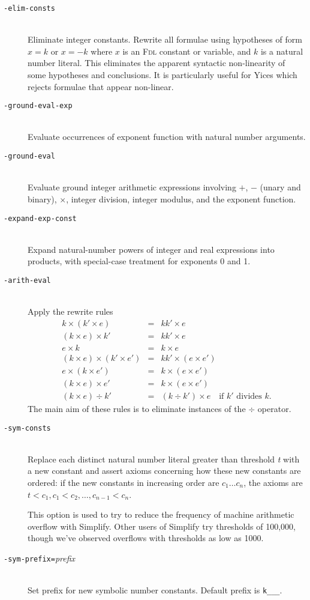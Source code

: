 \documentclass[12pt,fleqn]{article}
\newcommand{\fdl}{\textsc{Fdl}}
\newcommand{\optionb}[1]{\item[\texttt{-{#1}}]\ \\}
\newcommand{\optionv}[2]{\item[\texttt{-{#1}=}\mdseries\textit{#2}]\ \\}
\begin{document}
\begin{description}
\optionb{elim-consts}
  Eliminate integer constants. Rewrite all formulae using hypotheses of
  form $x = k$ or $x = -k$ where $x$ is an \fdl{} constant or variable,
  and $k$ is a natural number literal.  This eliminates the apparent
  syntactic non-linearity of some hypotheses and conclusions.  It is
  particularly useful for Yices which rejects formulae that appear
  non-linear.


\optionb{ground-eval-exp}
  Evaluate occurrences of exponent function with natural number arguments.

\optionb{ground-eval}
  Evaluate ground integer arithmetic expressions involving $+$, $-$
  (unary and binary), $\times$, integer division, integer modulus, and
  the exponent function.

\optionb{expand-exp-const}
  Expand natural-number powers of integer and real expressions into products,
  with special-case treatment for exponents 0 and 1.

\optionb{arith-eval}
  Apply the rewrite rules
  \begin{eqnarray*}
   k \times (k' \times e)   & =  &  kk' \times e \\
   (k \times e) \times k'   & =  &  kk' \times e \\
   e \times k               & =  &  k \times e \\
   (k \times e) \times (k' \times e') &  =  &  kk' \times (e \times e') \\
   e \times (k \times e')   &  = &  k \times (e \times e')  \\
   (k \times e) \times e'   & =  &  k \times (e \times e')  \\
  (k \times e) \div k'      & =  &   (k \div k') \times e  
      \quad\mbox{if $k'$ divides $k$}.
  \end{eqnarray*}
  The main aim of these rules is to eliminate instances of the $\div$
  operator.

\optionb{sym-consts}
  Replace each distinct natural number literal greater than 
  threshold \textit{t} with a new constant and assert axioms concerning
  how these new constants are ordered: if the new constants in increasing
  order are $c_1 \ldots c_n$, the axioms are 
  $t < c_1, c_1 < c_2, \ldots, c_{n-1} < c_n$.

  This option is used to try to reduce the frequency of machine
  arithmetic overflow with Simplify.  Other users of Simplify try
  thresholds of 100,000, though we've observed overflows with
  thresholds as low as 1000.

\optionv{sym-prefix}{prefix}
  Set prefix for new symbolic number constants.  Default prefix is
  \texttt{k\_\_\_}.


\end{description}
\end{document}

